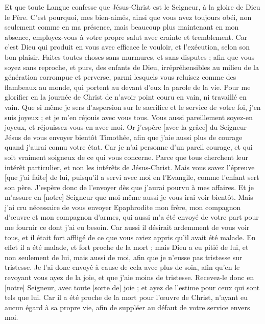 \begin{multicols}{2}
Et que toute Langue confesse que Jésus-Christ est le Seigneur, à la gloire de Dieu le Père.
C'est pourquoi, mes bien-aimés, ainsi que vous avez toujours obéi, non seulement comme en ma présence, mais beaucoup plus maintenant en mon absence, employez-vous à votre propre salut avec crainte et tremblement.
Car c'est Dieu qui produit en vous avec efficace le vouloir, et l'exécution, selon son bon plaisir.
Faites toutes choses sans murmures, et sans disputes ;
afin que vous soyez sans reproche, et purs, des enfants de Dieu, irrépréhensibles au milieu de la génération corrompue et perverse, parmi lesquels vous reluisez comme des flambeaux au monde, qui portent au devant d'eux la parole de la vie.
Pour me glorifier en la journée de Christ de n'avoir point couru en vain, ni travaillé en vain.
Que si même je sers d'aspersion sur le sacrifice et le service de votre foi, j'en suis joyeux ; et je m'en réjouis avec vous tous.
Vous aussi pareillement soyez-en joyeux, et réjouissez-vous-en avec moi.
Or j'espère [avec la grâce] du Seigneur Jésus de vous envoyer bientôt Timothée, afin que j'aie aussi plus de courage quand j'aurai connu votre état.
Car je n'ai personne d'un pareil courage, et qui soit vraiment soigneux de ce qui vous concerne.
Parce que tous cherchent leur intérêt particulier, et non les intérêts de Jésus-Christ.
Mais vous savez l'épreuve [que j'ai faite] de lui, puisqu'il a servi avec moi en l'Evangile, comme l'enfant sert son père.
J'espère donc de l'envoyer dès que j'aurai pourvu à mes affaires.
Et je m'assure en [notre] Seigneur que moi-même aussi je vous irai voir bientôt.
Mais j'ai cru nécessaire de vous envoyer Epaphrodite mon frère, mon compagnon d'œuvre et mon compagnon d'armes, qui aussi m'a été envoyé de votre part pour me fournir ce dont j'ai eu besoin.
Car aussi il désirait ardemment de vous voir tous, et il était fort affligé de ce que vous aviez appris qu'il avait été malade.
En effet il a été malade, et fort proche de la mort ; mais Dieu a eu pitié de lui, et non seulement de lui, mais aussi de moi, afin que je n'eusse pas tristesse sur tristesse.
Je l'ai donc envoyé à cause de cela avec plus de soin, afin qu'en le revoyant vous ayez de la joie, et que j'aie moins de tristesse.
Recevez-le donc en [notre] Seigneur, avec toute [sorte de] joie ; et ayez de l'estime pour ceux qui sont tels que lui.
Car il a été proche de la mort pour l'œuvre de Christ, n'ayant eu aucun égard à sa propre vie, afin de suppléer au défaut de votre service envers moi.

\end{multicols}
